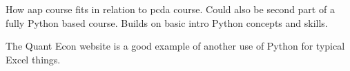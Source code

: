 \documentclass[ited,blindrev]{informs3}              %
\begin{document}
How aap course fits in relation to pcda course. Could also be second part of a fully Python based course. Builds on basic intro Python concepts and skills.

The Quant Econ website is a good example of another use of Python for typical Excel things.

\ACKNOWLEDGMENT{%
}%


%
%
%




\end{document}
